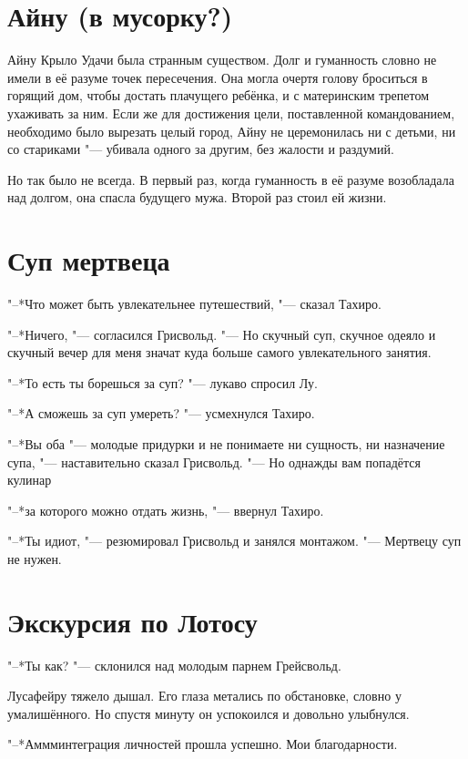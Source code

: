\section{Айну (в мусорку?)}

Айну Крыло Удачи была странным существом.
Долг и гуманность словно не имели в её разуме точек пересечения.
Она могла очертя голову броситься в горящий дом, чтобы достать плачущего ребёнка, и с материнским трепетом ухаживать за ним.
Если же для достижения цели, поставленной командованием, необходимо было вырезать целый город, Айну не церемонилась ни с детьми, ни со стариками "--- убивала одного за другим, без жалости и раздумий.

Но так было не всегда.
В первый раз, когда гуманность в её разуме возобладала над долгом, она спасла будущего мужа.
Второй раз стоил ей жизни.

\section{Суп мертвеца}

"--*Что может быть увлекательнее путешествий, "--- сказал Тахиро.

"--*Ничего, "--- согласился Грисвольд.
"--- Но скучный суп, скучное одеяло и скучный вечер для меня значат куда больше самого увлекательного занятия.

"--*То есть ты борешься за суп? "--- лукаво спросил Лу.

"--*А сможешь за суп умереть? "--- усмехнулся Тахиро.

"--*Вы оба "--- молодые придурки и не понимаете ни сущность, ни назначение супа, "--- наставительно сказал Грисвольд.
"--- Но однажды вам попадётся кулинар\ldotst

"--*\ldotst за которого можно отдать жизнь, "--- ввернул Тахиро.

"--*Ты идиот, "--- резюмировал Грисвольд и занялся монтажом.
"--- Мертвецу суп не нужен.

\section{Экскурсия по Лотосу}

"--*Ты как? "--- склонился над молодым парнем Грейсвольд.

Лусафейру тяжело дышал.
Его глаза метались по обстановке, словно у умалишённого. Но спустя минуту он успокоился и довольно улыбнулся.

"--*Аммм\ldotst интеграция личностей прошла успешно.
Мои благодарности.

